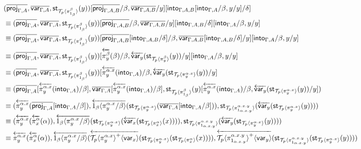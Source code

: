 \documentclass[10pt]{article}
\theoremstyle{definition}
\newcommand{\rewrite}[2]{\overleftarrow{#1}(#2)}
\newcommand\StI[2]{\ensuremath{\mathsf{st}_{#1}(#2)}}
\newcommand\ApEl[2]{\mathcal{T}_{#1}\langle#2\rangle}
\newcommand\ap[2]{\ensuremath{#1 \langle #2 \rangle }}
\newcommand\ApPlus[2]{\ensuremath{{#1}^+ \langle #2 \rangle }}
\begin{document}
\begin{align*}
&(\upstairs{\proj{\Gamma, A}}, \upstairs{\var{\Gamma, A}}, \StI{\ApEl{p}{\pi^{\beta}_{1_{\beta}}}}{y})[\upstairs{\proj{\Gamma, A, B}}/\beta, \upstairs{\var{\Gamma, A, B}}/y][\into{\Gamma, A, B}[\into{\Gamma, A}/\beta, y/y]/\delta] \\
&\equiv (\upstairs{\proj{\Gamma, A}}, \upstairs{\var{\Gamma, A}}, \StI{\ApEl{p}{\pi^{\beta}_{1_{\beta}}}}{y})[\upstairs{\proj{\Gamma, A, B}}/\beta, \upstairs{\var{\Gamma, A, B}}/y][\into{\Gamma, A, B}/\delta][\into{\Gamma, A}/\beta, y/y] \\
&\equiv (\upstairs{\proj{\Gamma, A}}, \upstairs{\var{\Gamma, A}}, \StI{\ApEl{p}{\pi^{\beta}_{1_{\beta}}}}{y})[\upstairs{\proj{\Gamma, A, B}}[\into{\Gamma, A, B}/\delta]/\beta, \upstairs{\var{\Gamma, A, B}}[\into{\Gamma, A, B}/\delta]/y][\into{\Gamma, A}/\beta, y/y] \\
&\equiv (\upstairs{\proj{\Gamma, A}}, \upstairs{\var{\Gamma, A}}, \StI{\ApEl{p}{\pi^{\beta}_{1_{\beta}}}}{y})[\rewrite{\pi^\beta_y}{\beta}/\beta, \rewrite{\var{y}}{\StI{\ApEl{p}{\pi^{\beta}_y}}{y}}/y][\into{\Gamma, A}/\beta, y/y] \\
&\equiv (\upstairs{\proj{\Gamma, A}}, \upstairs{\var{\Gamma, A}}, \StI{\ApEl{p}{\pi^{\beta}_{1_{\beta}}}}{y})[\rewrite{\pi^{\alpha.x}_y}{\into{\Gamma, A}}/\beta, \rewrite{\var{y}}{\StI{\ApEl{p}{\pi^{\alpha.x}_y}}{y}}/y] \\
&\equiv (\upstairs{\proj{\Gamma, A}}[\rewrite{\pi^{\alpha.x}_y}{\into{\Gamma, A}}/\beta], \upstairs{\var{\Gamma, A}}[\rewrite{\pi^{\alpha.x}_y}{\into{\Gamma, A}}/\beta], \StI{\ApEl{p}{\pi^{\beta}_{1_{\beta}}}}{y}[\rewrite{\pi^{\alpha.x}_y}{\into{\Gamma, A}}/\beta, \rewrite{\var{y}}{\StI{\ApEl{p}{\pi^{\alpha.x}_y}}{y}}/y])\\
&\equiv (\rewrite{\pi^{\alpha.x}_y}{\upstairs{\proj{\Gamma, A}}[\into{\Gamma, A}/\beta]}, \rewrite{\ap{1_\beta}{\pi^{\alpha.x}_y/\beta}}{\StI{\ApEl{p}{\pi^{\alpha.x}_y}}{\upstairs{\var{\Gamma, A}}[\into{\Gamma, A}/\beta]}}, \StI{\ApEl{p}{\pi^{\alpha.x.y}_{1_{\alpha.x.y}}}}{\rewrite{\var{y}}{\StI{\ApEl{p}{\pi^{\alpha.x}_y}}{y}}})\\
&\equiv (\rewrite{\pi^{\alpha.x}_y}{\rewrite{\pi^{\alpha}_x}{\alpha}}, \rewrite{\ap{1_\beta}{\pi^{\alpha.x}_y/\beta}}{\StI{\ApEl{p}{\pi^{\alpha.x}_y}}{\rewrite{\var{x}}{\StI{\ApEl{p}{\pi^{\alpha}_x}}{x}}}}, \StI{\ApEl{p}{\pi^{\alpha.x.y}_{1_{\alpha.x.y}}}}{\rewrite{\var{y}}{\StI{\ApEl{p}{\pi^{\alpha.x}_y}}{y}}})\\
&\equiv \rewrite{\pi^{\alpha.x}_y}{\rewrite{\pi^{\alpha}_x}{\alpha}}, \rewrite{\ap{1_\beta}{\pi^{\alpha.x}_y/\beta}}{\rewrite{\ApPlus{\ApEl{p}{\pi^{\alpha.x}_y}}{\var{x}}}{\StI{\ApEl{p}{\pi^{\alpha.x}_y}}{\StI{\ApEl{p}{\pi^{\alpha}_x}}{x}}}}, \rewrite{\ApPlus{\ApEl{p}{\pi^{\alpha.x.y}_{1_{\alpha.x.y}}}}{\var{y}}}{\StI{\ApEl{p}{\pi^{\alpha.x.y}_{1_{\alpha.x.y}}}}{\StI{\ApEl{p}{\pi^{\alpha.x}_y}}{y}}})\\

\end{align*}
\end{document}
